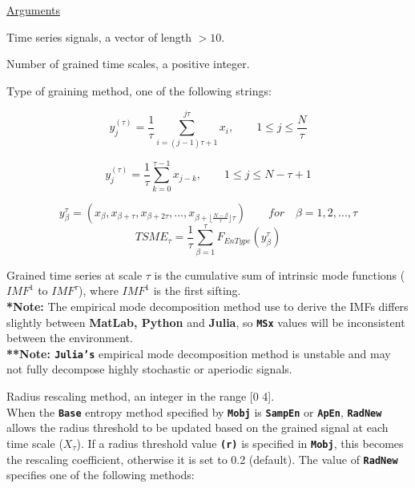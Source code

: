 \documentclass[12pt, a4paper, titlepage, openany]{book}
\begin{document}
\noindent \ul{Arguments}
\begin{description}[labelsep=1cm, labelwidth=2cm, nosep, style=multiline,leftmargin=3cm]\footnotesize
\item[\texttt{Sig}]		Time series signals, a vector of length $> 10$.
\item[\texttt{Scales}]		Number of grained time scales, a positive integer.
\item[\texttt{Methodx}]		Type of graining method, one of the following strings:
	\begin{description}[labelsep=8em, labelwidth=10em, nosep,style=multiline,leftmargin=3cm]
	\item[\texttt{"coarse"}]	\cite{MS1}
	\[y^{(\tau)}_{j} = \frac{1}{\tau} \sum^{j\tau}_{i=(j-1)\tau+1} x_{i},\qquad  1\leq j\leq \frac{N}{\tau}\] 
	\item[\texttt{"modified"}]	
	\[y^{(\tau)}_{j} = \frac{1}{\tau} \sum^{\tau-1}_{k=0} x_{j-k},	\qquad  1\leq j\leq N-\tau+1 \]		
	\item[\texttt{"timeshift"}] \cite{MS10}
	\[y^{\tau}_{\beta} = (x_{\beta}, x_{\beta+\tau}, x_{\beta+2\tau}, ... ,
	 x_{\beta+\lfloor\frac{N-\beta}{\tau}\rfloor \tau})  \qquad for \quad \beta  = 1, 2, ..., \tau \]
	\[TSME_{\tau} = \frac{1}{\tau}\sum^{\tau}_{\beta=1} F_{EnType}(y^{\tau}_{\beta}) \]
	\item[\texttt{"imf"}]	Grained time series at scale $ \tau $ is the cumulative sum of 							intrinsic mode 	functions ($ IMF^1 $ to $ IMF^\tau $), where $ IMF^1 $ is the first sifting. \cite{MS6}\\
			\textbf{*Note:} The empirical mode decomposition method use to derive the IMFs 											differs slightly between \textbf{MatLab, Python} and \textbf{Julia}, so 									\textbf{\texttt{MSx}} values will be inconsistent between the environment. \\
				\textbf{**Note: \texttt{Julia's}} empirical mode decomposition method is 								unstable and may not fully decompose highly stochastic or aperiodic signals.\\
	\end{description}
\item[\texttt{RadNew}]			Radius rescaling method, an integer in the range [0 4].\\
				 When the \texttt{\textbf{Base}} entropy method specified by \texttt{\textbf{Mobj}} is \texttt{\textbf{SampEn}} or \texttt{\textbf{ApEn}}, \texttt{\textbf{RadNew}} allows the radius threshold to be updated based on the grained signal at each time scale ($X_\tau$). If a radius threshold value \texttt{\textbf{(r)}} is specified in \texttt{\textbf{Mobj}},  this becomes the rescaling coefficient, otherwise it is set to 0.2 (default). The value of \texttt{\textbf{RadNew}} specifies one of the following methods:

\end{description}
\end{document}
